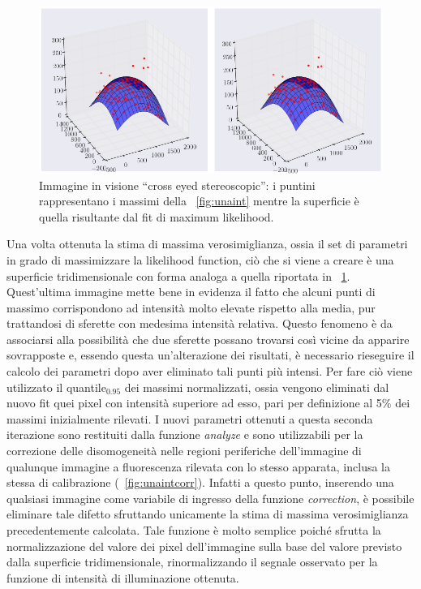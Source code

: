 \begin{figure}
 \centering
 \includegraphics[scale=0.45]{img/CAP3gauss.png}
 \caption{\small{Immagine in visione ``cross eyed stereoscopic'': i puntini rappresentano i massimi della \figurename~\ref{fig:unaint} mentre la superficie è quella risultante dal fit di maximum likelihood.}}
 \label{fig:gauss}
\end{figure}

Una volta ottenuta la stima di massima verosimiglianza, ossia il set di parametri in grado di massimizzare la likelihood function, ciò che si viene a creare è una superficie tridimensionale con forma analoga a quella riportata in \figurename~\ref{fig:gauss}. 
Quest'ultima immagine mette bene in evidenza il fatto che alcuni punti di massimo corrispondono ad intensità molto elevate rispetto alla media, pur trattandosi di sferette con medesima intensità relativa.
Questo fenomeno è da associarsi alla possibilità che due sferette possano trovarsi così vicine da apparire sovrapposte e, essendo questa un'alterazione dei risultati, è necessario rieseguire il calcolo dei parametri dopo aver eliminato tali punti più intensi. 
Per fare ciò viene utilizzato il quantile$_{0.95}$ dei massimi normalizzati, ossia vengono eliminati dal nuovo fit quei pixel con intensità superiore ad esso, pari per definizione al 5\% dei massimi inizialmente rilevati.
I nuovi parametri ottenuti a questa seconda iterazione sono restituiti dalla funzione \textit{analyze} e sono utilizzabili per la correzione delle disomogeneità nelle regioni periferiche dell'immagine di qualunque immagine a fluorescenza rilevata con lo stesso apparata, inclusa la stessa di calibrazione (\figurename~\ref{fig:unaintcorr}).
Infatti a questo punto, inserendo una qualsiasi immagine come variabile di ingresso della funzione \textit{correction}, è possibile eliminare tale difetto sfruttando unicamente la stima di massima verosimiglianza precedentemente calcolata. 
Tale funzione è molto semplice poiché sfrutta la normalizzazione del valore dei pixel dell'immagine sulla base del valore previsto dalla superficie tridimensionale, rinormalizzando il segnale osservato per la funzione di intensità di illuminazione ottenuta.

